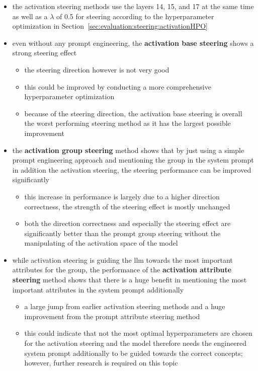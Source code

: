\begin{itemize}
  \item the activation steering methods use the layers \num{14}, \num{15}, and \num{17} at the same time as well as a \(\lambda\) of \num{0.5} for steering according to the hyperparameter optimization in Section~\ref{sec:evaluation:steering:activationHPO}
  \item even without any prompt engineering, the \textbf{activation base steering} shows a strong steering effect
        \begin{itemize}
          \item the steering direction however is not very good
          \item this could be improved by conducting a more comprehensive hyperparameter optimization
          \item because of the steering direction, the activation base steering is overall the worst performing steering method as it has the largest possible improvement
        \end{itemize}
  \item the \textbf{activation group steering} method shows that by just using a simple prompt engineering approach and mentioning the group in the system prompt in addition the activation steering, the steering performance can be improved significantly
        \begin{itemize}
          \item this increase in performance is largely due to a higher direction correctness, the strength of the steering effect is mostly unchanged
          \item both the direction correctness and especially the steering effect are significantly better than the prompt group steering without the manipulating of the activation space of the model
        \end{itemize}
  \item while activation steering is guiding the \ac{llm} towards the most important attributes for the group, the performance of the \textbf{activation attribute steering} method shows that there is a huge benefit in mentioning the most important attributes in the system prompt additionally
        \begin{itemize}
          \item a large jump from earlier activation steering methods and a huge improvement from the prompt attribute steering method
          \item this could indicate that not the most optimal hyperparameters are chosen for the activation steering and the model therefore needs the engineered system prompt additionally to be guided towards the correct concepts; however, further research is required on this topic

\end{itemize}
\end{itemize}
